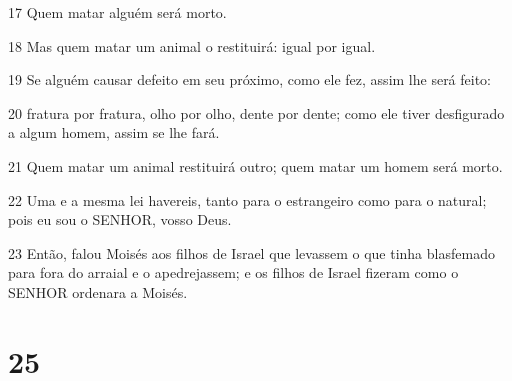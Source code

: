 \par 17 Quem matar alguém será morto.
\par 18 Mas quem matar um animal o restituirá: igual por igual.
\par 19 Se alguém causar defeito em seu próximo, como ele fez, assim lhe será feito:
\par 20 fratura por fratura, olho por olho, dente por dente; como ele tiver desfigurado a algum homem, assim se lhe fará.
\par 21 Quem matar um animal restituirá outro; quem matar um homem será morto.
\par 22 Uma e a mesma lei havereis, tanto para o estrangeiro como para o natural; pois eu sou o SENHOR, vosso Deus.
\par 23 Então, falou Moisés aos filhos de Israel que levassem o que tinha blasfemado para fora do arraial e o apedrejassem; e os filhos de Israel fizeram como o SENHOR ordenara a Moisés.

\chapter{25}

